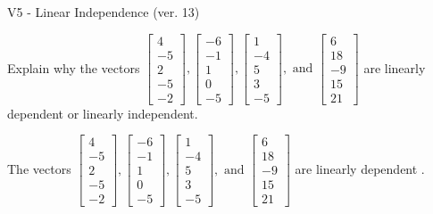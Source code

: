 \begin{exercise}
  \begin{exerciseTitle}V5 - Linear Independence (ver. 13)\end{exerciseTitle}
  \begin{exerciseStatement}
    Explain why the vectors \(\left[\begin{array}{r}
4 \\
-5 \\
2 \\
-5 \\
-2
\end{array}\right] , \left[\begin{array}{r}
-6 \\
-1 \\
1 \\
0 \\
-5
\end{array}\right] , \left[\begin{array}{r}
1 \\
-4 \\
5 \\
3 \\
-5
\end{array}\right] , \text{ and } \left[\begin{array}{r}
6 \\
18 \\
-9 \\
15 \\
21
\end{array}\right]\) are linearly dependent or linearly independent.	


  \end{exerciseStatement}
  \begin{exerciseAnswer}
   The vectors \(\left[\begin{array}{r}
4 \\
-5 \\
2 \\
-5 \\
-2
\end{array}\right] , \left[\begin{array}{r}
-6 \\
-1 \\
1 \\
0 \\
-5
\end{array}\right] , \left[\begin{array}{r}
1 \\
-4 \\
5 \\
3 \\
-5
\end{array}\right] , \text{ and } \left[\begin{array}{r}
6 \\
18 \\
-9 \\
15 \\
21
\end{array}\right]\) are 
  	 linearly dependent  .
  


  \end{exerciseAnswer}
\end{exercise}